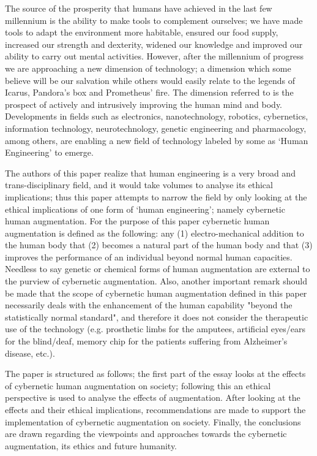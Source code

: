 
The source of the prosperity that humans have achieved in the last few millennium is the ability to make tools to complement ourselves; we have made tools to adapt the environment more habitable, ensured our food supply, increased our strength and dexterity, widened our knowledge and improved our ability to carry out mental activities. However, after the  millennium of progress we are approaching a new dimension of technology; a dimension which some believe will be our salvation while others would easily relate to the legends of Icarus, Pandora’s box and Prometheus’ fire. The dimension referred to is the prospect of actively and intrusively improving the human mind and body. Developments in fields such as electronics, nanotechnology, robotics, cybernetics, information technology, neurotechnology, genetic engineering and pharmacology, among others, are enabling a new field of technology labeled by some as ‘Human Engineering’ to emerge.

The authors of this paper realize that human engineering is a very broad and trans-disciplinary field, and it would take volumes to analyse its ethical implications; thus this paper attempts to narrow the field by only looking at the ethical implications of one form of ‘human engineering’; namely cybernetic human augmentation. For the purpose of this paper cybernetic human augmentation is defined as the following: any (1) electro-mechanical addition to the human body that (2) becomes a natural part of the human body and that (3) improves the performance of an individual beyond normal human capacities. Needless to say genetic or chemical forms of human augmentation are external to the purview of cybernetic augmentation. Also, another important remark should be made that the scope of cybernetic human augmentation defined in this paper necessarily deals with the enhancement of the human capability "beyond the statistically normal standard", and therefore it does not consider the therapeutic use of the technology (e.g. prosthetic limbs for the amputees, artificial eyes/ears for the blind/deaf, memory chip for the patients suffering from Alzheimer's disease, etc.).

The paper is structured as follows; the first part of the essay looks at the effects of cybernetic human augmentation on society; following this an ethical perspective is used to analyse the effects of augmentation. After looking at the effects and their ethical implications, recommendations are made to support the implementation of cybernetic augmentation on society. Finally, the conclusions are drawn regarding the viewpoints and approaches towards the cybernetic augmentation, its ethics and future humanity.